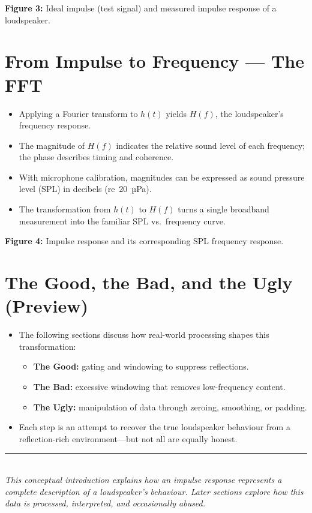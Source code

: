 \documentclass[12pt,a4paper]{article}
\begin{document}
\vspace{1em}
\noindent\textbf{Figure 3:} Ideal impulse (test signal) and measured impulse response of a loudspeaker.

\section{From Impulse to Frequency --- The FFT}

\begin{itemize}[noitemsep]
    \item Applying a Fourier transform to \(h(t)\) yields \(H(f)\), the loudspeaker’s frequency response.
    \item The magnitude of \(H(f)\) indicates the relative sound level of each frequency; the phase describes timing and coherence.
    \item With microphone calibration, magnitudes can be expressed as sound pressure level (SPL) in decibels (re~20~µPa).
    \item The transformation from \(h(t)\) to \(H(f)\) turns a single broadband measurement into the familiar SPL vs.\ frequency curve.
\end{itemize}

\vspace{1em}
\noindent\textbf{Figure 4:} Impulse response and its corresponding SPL frequency response.

\section{The Good, the Bad, and the Ugly (Preview)}

\begin{itemize}[noitemsep]
    \item The following sections discuss how real-world processing shapes this transformation:
    \begin{itemize}
        \item \textbf{The Good:} gating and windowing to suppress reflections.
        \item \textbf{The Bad:} excessive windowing that removes low-frequency content.
        \item \textbf{The Ugly:} manipulation of data through zeroing, smoothing, or padding.
    \end{itemize}
    \item Each step is an attempt to recover the true loudspeaker behaviour from a reflection-rich environment—but not all are equally honest.
\end{itemize}

\vspace{1em}
\noindent\rule{\textwidth}{0.4pt}\\
\textit{This conceptual introduction explains how an impulse response represents a complete description of a loudspeaker’s behaviour. Later sections explore how this data is processed, interpreted, and occasionally abused.}
\end{document}

